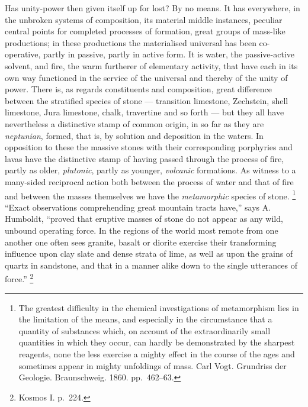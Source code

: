 \documentclass[12pt,a4paper]{book}
\renewcommand{\thefootnote}{*)}
\begin{document}
Has unity-power then given itself up for lost? By no means. It has everywhere, in the unbroken systems of composition,
its material middle instances, peculiar central points for completed processes of formation, great groups of mass-like
productions; in these productions the materialised universal has been co-operative, partly in passive, partly in active
form. It is water, the passive-active solvent, and fire, the warm furtherer of elementary activity, that have each in its
own way functioned in the service of the universal and thereby of the unity of power. There is, as regards constituents
and composition, great difference between the stratified
species of stone --- transition limestone, Zechstein, shell limestone, Jura limestone, chalk, travertine and so forth ---
but they all have nevertheless a distinctive stamp of common origin, in so far as they are \emph{neptunian}, formed,
that is, by solution and deposition in the waters. In opposition to these the massive stones with their corresponding
porphyries and lavas have the distinctive stamp of having passed through the process of fire, partly as older,
\emph{plutonic}, partly as younger, \emph{volcanic} formations. As witness to a many-sided reciprocal action both between
the process of water and that of fire
and between the masses themselves we have the \emph{metamorphic} species of stone.%
\footnote{%
The greatest difficulty in the chemical investigations of metamorphism lies in the limitation of the means, and
especially in the circumstance that a quantity of substances which, on account of the extraordinarily small quantities in
which they occur, can hardly be demonstrated by the sharpest reagents, none the less exercise a mighty effect in the
course of the ages and sometimes appear in mighty unfoldings of mass. Carl Vogt. Grundriss der Geologie. Braunschweig.
1860. pp.\ 462--63.}
``Exact observations comprehending great mountain tracts have,'' says A. Humboldt, ``proved that eruptive masses of stone
do not appear as any wild, unbound operating force. In the regions of the world most remote from one another one often
sees granite, basalt or diorite exercise their transforming influence upon clay slate and dense strata of lime, as well
as upon the grains of quartz in sandstone, and that in a manner alike down to the single utterances of force.''%
\renewcommand{\thefootnote}{**)}%
\footnote{%
Kosmos I. p.\ 224.}%
\renewcommand{\thefootnote}{*)}
\end{document}
